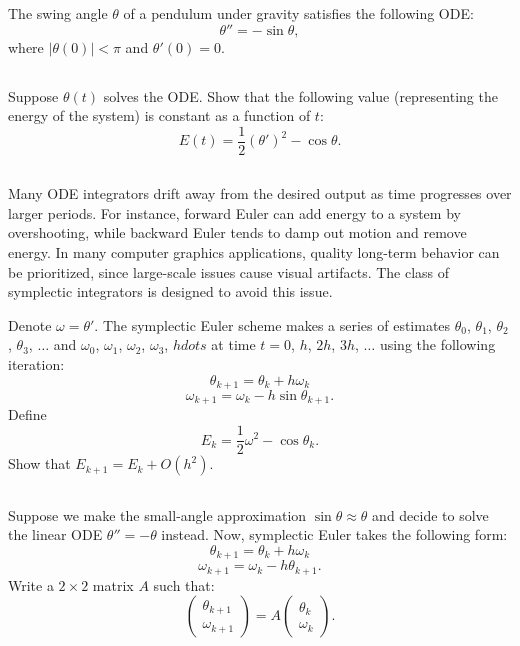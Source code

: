 The swing angle $\theta$ of a pendulum under gravity satisfies the following ODE:
$$\theta'' = -\sin \theta,$$
where $|\theta(0)| < \pi$ and $\theta'(0) = 0$.

\subsection{} Suppose $\theta(t)$ solves the ODE. Show that the following value (representing the energy of the system) is constant as a function of $t$:
$$E(t) = \frac{1}{2}(\theta')^2 - \cos \theta.$$

\subsection{} Many ODE integrators drift away from the desired output as time progresses over larger periods. For instance, forward Euler can add energy to a system by overshooting, while backward Euler tends to damp out motion and remove energy. In many computer graphics applications, quality long-term behavior can be prioritized, since large-scale issues cause visual artifacts. The class of symplectic integrators is designed to avoid this issue.

Denote $\omega = \theta'$. The symplectic Euler scheme makes a series of estimates $\theta_ 0$, $\theta_ 1$, $\theta_ 2$, $\theta_ 3$, $\hdots$ and $\omega_0$, $\omega_1$, $\omega_2$, $\omega_3$, $hdots$ at time $t = 0$, $h$, $2h$, $3h$, $\hdots$ using the following iteration:
$$\theta_{k+1} = \theta_k + h\omega_k$$
$$\omega_{k+1} = \omega_k - h \sin \theta_{k+1}.$$
Define
$$E_k = \frac{1}{2}\omega^2 - \cos \theta_k.$$
Show that $E_{k+1} = E_k + O(h^2)$.

\subsection{} \label{q} Suppose we make the small-angle approximation $\sin \theta \approx \theta$ and decide to solve the linear ODE $\theta'' = -\theta$ instead. Now, symplectic Euler takes the following form:
$$\theta_{k+1} = \theta_k + h\omega_k$$
$$\omega_{k+1} = \omega_k - h\theta_{k+1}.$$
Write a $2 \times 2$ matrix $A$ such that:
$$
\left(\begin{matrix}
  \theta_{k+1} \\
  \omega_{k+1}
  \end{matrix} \right)
=
A
  \left(\begin{matrix}
     \theta_k \\
  \omega_k
  \end{matrix} \right)
  .$$

